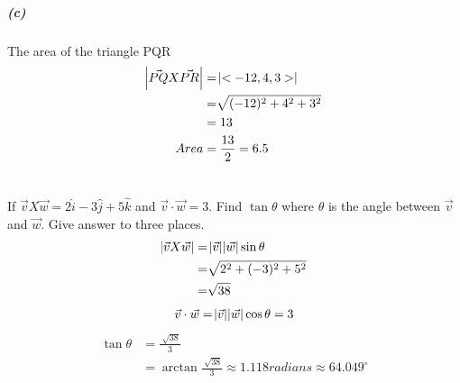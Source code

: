 \documentclass[a4paper]{article}
\begin{document}
\subparagraph{(c)}
The area of the triangle PQR
\begin{equation*}
\begin{split}
\abs{\vec{PQ}X \vec{PR}} &=\abs{<-12,4,3>} \\
&=\sqrt[]{(-12)^2+4^2+3^2}\\
&=13\\
Area&= \frac{13}{2}=6.5\\ 
\end{split}
\end{equation*}


\section{}
\subparagraph{}
If $\vec{v}X \vec{w} =2\hat{i}-3\hat{j}+5\hat{k}$ and $\vec{v}\cdot \vec{w}=3$. Find $\tan{\theta}$ where $\theta$ is the angle between $\vec{v}$ and $\vec{w}$. Give answer to three places.
\begin{equation*}
\begin{split}
\abs{\vec{v}X \vec{w}}
&= \abs{\vec{v}} \abs{\vec{w}} \sin{\theta}\\
&=\sqrt[]{2^2+(-3)^2+5^2}\\
&=\sqrt[]{38}\\
\end{split}
\end{equation*}
\begin{equation*}
\begin{split}
\vec{v}\cdot\vec{w}=\abs{\vec{v}}\abs{\vec{w}}\cos{\theta}=3
\end{split}
\end{equation*}
\begin{equation*}
\begin{split}
\tan{\theta}&=\frac{\sqrt[]{38}}{3}\\ 
&= \arctan{\frac{\sqrt[]{38}}{3}} \approx 1.118 radians \approx64.049^{\circ}
\end{split}
\end{equation*}
\end{document}
